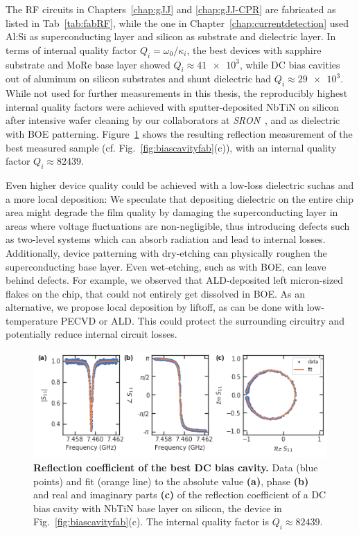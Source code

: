 The RF circuits in Chapters~\ref{chap:gJJ} and \ref{chap:gJJ-CPR} are fabricated as listed in Tab~\ref{tab:fabRF}, while the one in Chapter~\ref{chap:currentdetection} used Al:Si as superconducting layer and silicon as substrate and dielectric layer.
%
In terms of internal quality factor $Q_i=\omega_0/\kappa_i$, the best devices with sapphire substrate and MoRe base layer showed $Q_i\approx\num{41e3}$, while DC bias cavities out of aluminum on silicon substrates and shunt dielectric had $Q_i\approx\num{29e3}$.
%
While not used for further measurements in this thesis, the reproducibly highest internal quality factors were achieved with sputter-deposited NbTiN on silicon after intensive wafer cleaning by our collaborators at \textit{SRON}~\cite{thoenSuperconductingNbTinThin2017}, and  as dielectric with BOE patterning.
%
Figure~\ref{fig:s11NbTiN} shows the resulting reflection measurement of the best measured sample (cf. Fig.~\ref{fig:biascavityfab}(c)), with an internal quality factor $Q_i\approx\num{82439}$.

Even higher device quality could be achieved with a low-loss dielectric suchas  and a more local deposition:
%
We speculate that depositing dielectric on the entire chip area might degrade the film quality by damaging the superconducting layer in areas where voltage fluctuations are non-negligible, thus introducing defects such as two-level systems which can absorb radiation and lead to internal losses.
%
Additionally, device patterning with dry-etching can physically roughen the superconducting base layer.
%
Even wet-etching, such as with BOE, can leave behind defects.
%
For example, we observed that ALD-deposited  left micron-sized flakes on the chip, that could not entirely get dissolved in BOE.
%
As an alternative, we propose local deposition by liftoff, as can be done with low-temperature PECVD or ALD.
%
This could protect the surrounding circuitry and potentially reduce internal circuit losses.

\begin{figure}
	\centering
	\includegraphics[width=\linewidth]{chapter-experimental-methods/figs-fabrication/s11_NbTiN}
	\caption{
		\textbf{Reflection coefficient of the best DC bias cavity.}
		Data (blue points) and fit (orange line) to the absolute value \textbf{(a)}, phase \textbf{(b)} and real and imaginary parts \textbf{(c)} of the reflection coefficient of a DC bias cavity with NbTiN base layer on silicon, the device in Fig.~\ref{fig:biascavityfab}(c).
		The internal quality factor is $Q_i\approx\num{82439}$.
	}
	\label{fig:s11NbTiN}
\end{figure}